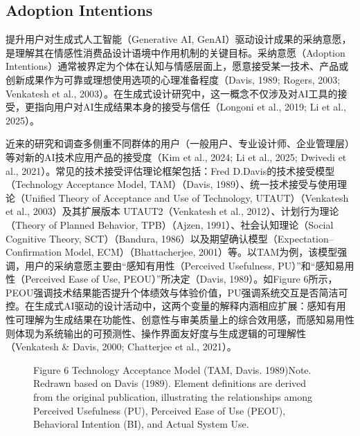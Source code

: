 \subsection{Adoption Intentions}

提升用户对生成式人工智能（Generative AI, GenAI）驱动设计成果的采纳意愿，是理解其在情感性消费品设计语境中作用机制的关键目标。采纳意愿（Adoption Intentions）通常被界定为个体在认知与情感层面上，愿意接受某一技术、产品或创新成果作为可靠或理想使用选项的心理准备程度（Davis, 1989; Rogers, 2003; Venkatesh et al., 2003）。在生成式设计研究中，这一概念不仅涉及对AI工具的接受，更指向用户对AI生成结果本身的接受与信任（Longoni et al., 2019; Li et al., 2025）。

近来的研究和调查多侧重不同群体的用户（一般用户、专业设计师、企业管理层）等对新的AI技术应用产品的接受度（Kim et al., 2024; Li et al., 2025; Dwivedi et al., 2021）。常见的技术接受评估理论框架包括：Fred D.Davis的技术接受模型（Technology Acceptance Model, TAM）（Davis, 1989）、统一技术接受与使用理论（Unified Theory of Acceptance and Use of Technology, UTAUT）（Venkatesh et al., 2003）及其扩展版本 UTAUT2（Venkatesh et al., 2012）、计划行为理论（Theory of Planned Behavior, TPB）（Ajzen, 1991）、社会认知理论（Social Cognitive Theory, SCT）（Bandura, 1986）以及期望确认模型（Expectation–Confirmation Model, ECM）（Bhattacherjee, 2001）等。以TAM为例，该模型强调，用户的采纳意愿主要由“感知有用性（Perceived Usefulness, PU）”和“感知易用性（Perceived Ease of Use, PEOU）”所决定（Davis, 1989）。如Figure 6所示，PEOU强调技术结果能否提升个体绩效与体验价值，PU强调系统交互是否简洁可控。在生成式AI驱动的设计活动中，这两个变量的解释内涵相应扩展：感知有用性可理解为生成结果在功能性、创意性与审美质量上的综合效用感，而感知易用性则体现为系统输出的可预测性、操作界面友好度与生成逻辑的可理解性（Venkatesh \& Davis, 2000; Chatterjee et al., 2021）。

\begin{figure}[htbp]

  \centering



  \caption{Figure 6 Technology Acceptance Model (TAM, Davis. 1989)Note. Redrawn based on Davis (1989). Element definitions are derived from the original publication, illustrating the relationships among Perceived Usefulness (PU), Perceived Ease of Use (PEOU), Behavioral Intention (BI), and Actual System Use.}

  \label{fig:figure_6_technology_acceptance_model_tam}

\end{figure}

